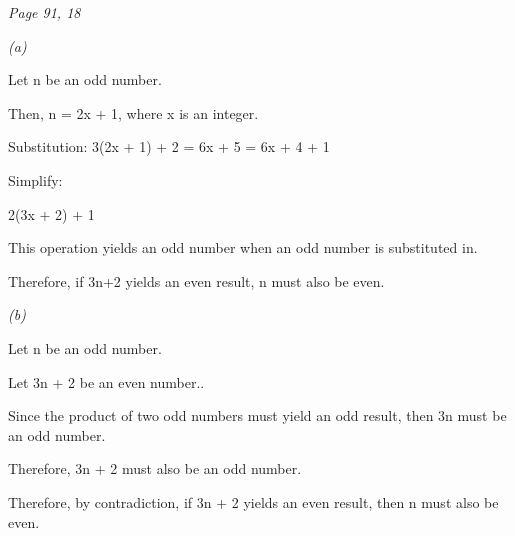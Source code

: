 \documentclass{article}
\begin{document}
\begin{flushleft}
\vspace{0.25cm}
\textit{Page 91, 18}\par
\textit{(a)}\par
Let n be an odd number.\par
Then, n = 2x + 1, where x is an integer.\par
Substitution: 3(2x + 1) + 2 = 6x + 5 = 6x + 4 + 1\par
Simplify:\par
2(3x + 2) + 1\par
This operation yields an odd number when an odd number is substituted in.\par
Therefore, if 3n+2  yields an even result, n must also be even.

\vspace{0.25cm}
\textit{(b)}\par
Let n be an  odd number.\par
Let 3n + 2 be an even number..\par
Since the product of two odd numbers must yield an odd result, then 3n must be an odd number.\par
Therefore, 3n + 2 must also be an odd number.\par
Therefore, by contradiction, if 3n + 2 yields an even result, then n must also be even.

\end{flushleft}
\end{document}
